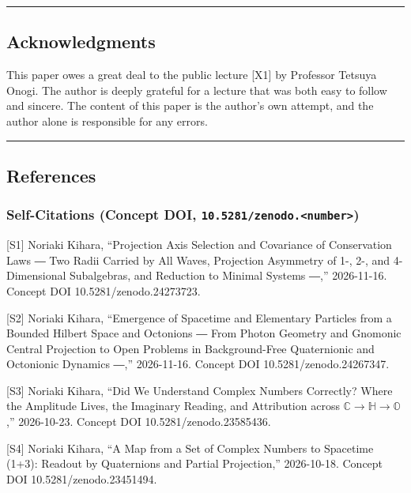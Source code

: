 \documentclass[
  a4paper,
]{article}
\begin{document}
\begin{center}\rule{0.5\linewidth}{0.5pt}\end{center}

\subsection{Acknowledgments}\label{acknowledgments}

This paper owes a great deal to the public lecture {[}X1{]} by Professor
Tetsuya Onogi. The author is deeply grateful for a lecture that was both
easy to follow and sincere. The content of this paper is the author's
own attempt, and the author alone is responsible for any errors.

\begin{center}\rule{0.5\linewidth}{0.5pt}\end{center}

\subsection{References}\label{references}

\subsubsection{\texorpdfstring{Self-Citations (Concept DOI,
\texttt{10.5281/zenodo.\textless{}number\textgreater{}})}{Self-Citations (Concept DOI, 10.5281/zenodo.\textless number\textgreater)}}\label{self-citations-concept-doi-10.5281zenodo.number}

{[}S1{]} Noriaki Kihara, ``Projection Axis Selection and Covariance of
Conservation Laws ― Two Radii Carried by All Waves, Projection Asymmetry
of 1-, 2-, and 4-Dimensional Subalgebras, and Reduction to Minimal
Systems ―,'' 2026-11-16. Concept DOI 10.5281/zenodo.24273723.

{[}S2{]} Noriaki Kihara, ``Emergence of Spacetime and Elementary
Particles from a Bounded Hilbert Space and Octonions ― From Photon
Geometry and Gnomonic Central Projection to Open Problems in
Background-Free Quaternionic and Octonionic Dynamics ―,'' 2026-11-16.
Concept DOI 10.5281/zenodo.24267347.

{[}S3{]} Noriaki Kihara, ``Did We Understand Complex Numbers Correctly?
Where the Amplitude Lives, the Imaginary Reading, and Attribution across
\(\mathbb{C} \to \mathbb{H} \to \mathbb{O}\),'' 2026-10-23. Concept DOI
10.5281/zenodo.23585436.

{[}S4{]} Noriaki Kihara, ``A Map from a Set of Complex Numbers to
Spacetime (1+3): Readout by Quaternions and Partial Projection,''
2026-10-18. Concept DOI 10.5281/zenodo.23451494.
\end{document}
